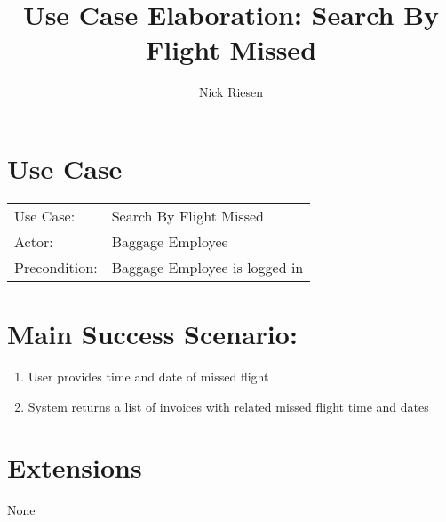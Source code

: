 \documentclass{article}
\title{Use Case Elaboration: Search By Flight Missed}
\author{ Nick Riesen }
\begin{document}
\maketitle


\section*{Use Case}
\begin{tabular}{l l}
Use Case:     & Search By Flight Missed       \\
Actor:        & Baggage Employee              \\
Precondition: & Baggage Employee is logged in \\
\end{tabular}


\section*{Main Success Scenario:}

\begin{enumerate}
    \item  User provides time and date of missed flight
    \item System returns a list of invoices with related missed flight time and dates

\end{enumerate}

\section*{Extensions}
None
\end{document}
